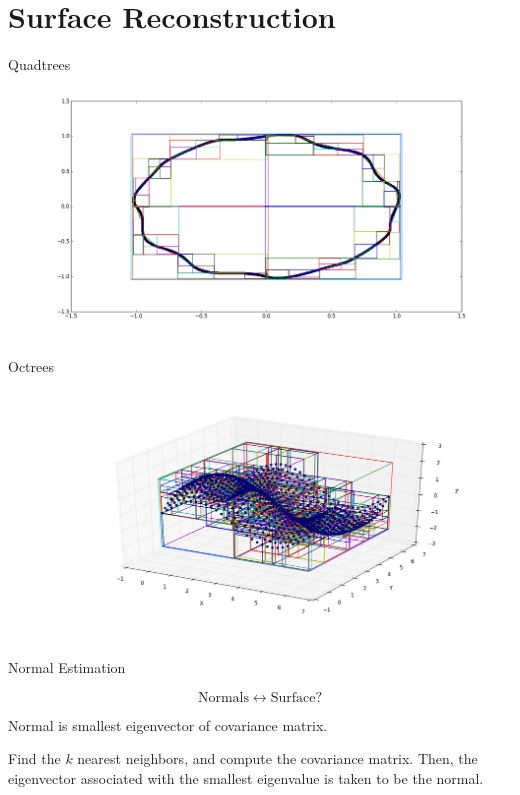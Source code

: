 \documentclass{beamer}
\begin{document}
\section{Surface Reconstruction}
\begin{frame}{Quadtrees}
  \includegraphics[width=\textwidth]{quadtree.png}
\end{frame}
\begin{frame}{Octrees}
  \includegraphics[width=\textwidth]{octree.png}
\end{frame}

\begin{frame}{Normal Estimation}
  \begin{Huge}
    $$\text{Normals} \leftrightarrow \text{Surface}?$$
  \end{Huge}
  
  Normal is smallest eigenvector of covariance matrix.
  
  Find the $k$ nearest neighbors, and compute the covariance matrix. Then, the eigenvector associated with the smallest eigenvalue is taken to be the normal.
  
  
\end{frame}
\end{document}
